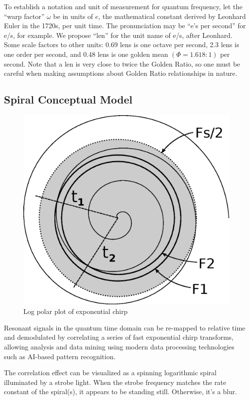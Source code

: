 To establish a notation and unit of measurement for quantum frequency,
let the ``warp factor'' $\omega$ be in units of $e$, the
mathematical constant derived by Leonhard Euler in the 1720s, per unit time.
The pronunciation may be ``e's per second'' for e/s, for example.
We propose ``len'' for the unit name of e/s, after Leonhard.
Some scale factors to other units: 0.69 lens is one octave per second,
2.3 lens is one order per second, and 0.48 lens is one golden mean
$(\Phi=1.618:1)$ per second.
Note that a len is very close to twice the Golden Ratio,
so one must be careful when making assumptions about Golden Ratio relationships
in nature.

\subsection{Spiral Conceptual Model}

\begin{figure}[h]
	\centering
	\includegraphics[width=0.7\linewidth]{../source/spiral_e}
	\caption[Quantum to Relative Time Relation]{Log polar plot of exponential chirp}
	\label{fig:spiral}
\end{figure}

Resonant signals in the quantum time domain can be re-mapped to relative time
and demodulated by correlating a series of fast exponential chirp
transforms, allowing analysis and data mining using modern data
processing technologies such as AI-based pattern recognition.

The correlation effect can be visualized as a spinning logarithmic spiral
illuminated by a strobe light. When the strobe frequency matches the rate
constant of the spiral(s), it appears to be standing still.
Otherwise, it's a blur.


